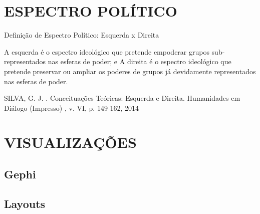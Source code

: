 
\section{\texorpdfstring{\MakeUppercase{Espectro Político}}{}}
\label{conceitos__espectro-politico}

Definição de Espectro Político: Esquerda x Direita

A esquerda é o espectro ideológico que pretende empoderar grupos sub-representados nas esferas de
poder; e
A direita é o espectro ideológico que pretende preservar ou ampliar os poderes de grupos já devidamente
representados nas esferas de poder.

SILVA, G. J. . Conceituações Teóricas: Esquerda e Direita. Humanidades em Diálogo (Impresso) , v. VI, p. 149-162, 2014



\section{\texorpdfstring{\MakeUppercase{Visualizações}}{}}
\label{conceitos__visualizacoes}
\subsection{Gephi}
\label{conceitos__visualizacoes--gephi}


\subsection{Layouts}
\label{conceitos__visualizacoes--layouts}

